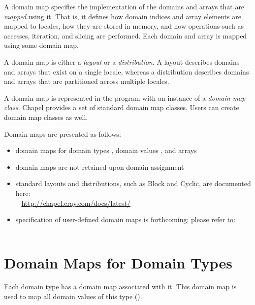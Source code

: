 \label{Domain_Maps}

A domain map specifies the implementation of the domains and arrays
that are \emph{mapped} using it. That is, it defines how domain indices
and array elements are mapped to locales, how they are stored in
memory, and how operations such as accesses, iteration, and slicing
are performed.  Each domain and array is mapped using some domain map.

A domain map is either a \emph{layout} or a \emph{distribution}.
A layout describes domains and arrays that exist on a single locale,
whereas a distribution describes domains and arrays that are
partitioned across multiple locales.

A domain map is represented in the program with an instance of
a \emph{domain map class}.
Chapel provides a set of standard domain map classes.
Users can create domain map classes as well.

Domain maps are presented as follows:
\begin{itemize}
\item domain maps for domain types ,
      domain values , and
      arrays 
\item domain maps are not retained upon domain assignment
\item standard layouts and distributions, such as Block and Cyclic,
are documented here:
\\ %
\mbox{$$ $$ $$} %
\url{http://chapel.cray.com/docs/latest/}
\item specification of user-defined domain maps is forthcoming;
please refer to:
\\ %
\mbox{$$ $$ $$} %
\end{itemize}


\section{Domain Maps for Domain Types}
\label{Domain_Maps_For_Types}

Each domain type has a domain map associated with it.
This domain map is used to map all domain values of this type
().

